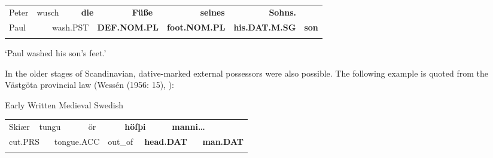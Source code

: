 \begin{tabular}{llllllllllll}
\lsptoprule
Peter & \multicolumn{2}{l}{wusch

} & \multicolumn{2}{l}{{\bfseries die}

} & \multicolumn{2}{l}{{\bfseries Füße}

} & \multicolumn{2}{l}{{\bfseries seines}

} & \multicolumn{2}{l}{{\bfseries Sohns.}

} & \\
\multicolumn{2}{l}{Paul

} & \multicolumn{2}{l}{wash.PST

} & \multicolumn{2}{l}{{\bfseries DEF.NOM.PL}

} & \multicolumn{2}{l}{{\bfseries foot.NOM.PL}

} & \multicolumn{2}{l}{{\bfseries his.DAT.M.SG}

} & \multicolumn{2}{l}{{\bfseries son}

}\\
\lspbottomrule
\end{tabular}

\begin{styleTranslation}
‘Paul washed his son’s feet.’

\end{styleTranslation}

\begin{styleBodyTextFirst}
In the older stages of Scandinavian, dative-marked external possessors were also possible. The following example is quoted from the Västgöta provincial law (Wessén (1956: 15), \citet[212]{Norde1997}): 

\end{styleBodyTextFirst}


\begin{listWWNumileveli}
\item {}

\begin{styleExample}
Early Written Medieval Swedish

\end{styleExample}

\end{listWWNumileveli}

\begin{tabular}{llllllllll}
\lsptoprule
Skiær & \multicolumn{2}{l}{tungu

} & \multicolumn{2}{l}{ör

} & \multicolumn{2}{l}{{\bfseries höfþi}

} & \multicolumn{2}{l}{{\bfseries manni…}

} & \\
\multicolumn{2}{l}{cut.PRS

} & \multicolumn{2}{l}{tongue.ACC

} & \multicolumn{2}{l}{out\_of

} & \multicolumn{2}{l}{{\bfseries head.DAT}

} & \multicolumn{2}{l}{{\bfseries man.DAT}

}\\
\lspbottomrule
\end{tabular}

